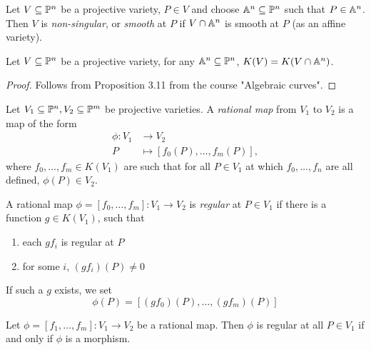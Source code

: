 \begin{definition}
	Let $V \subseteq \mathbb{P}^n$ be a projective variety,
	$P \in V$ and choose $\mathbb{A}^n \subseteq \mathbb{P}^n$ such
	that $P \in \mathbb{A}^n$. Then $V$ is \emph{non-singular}, or \emph{smooth}
	at $P$ if $V \cap \mathbb{A}^n$ is smooth at $P$ (as an affine variety).
\end{definition}

\begin{proposition}
	Let $V \subseteq \mathbb{P}^n$ be a projective variety,
	for any $\mathbb{A}^n \subseteq \mathbb{P}^n$, $K(V) = K(V\cap \mathbb{A}^n)$.
\end{proposition}

\begin{proof}
	Follows from Proposition 3.11 from the course "Algebraic curves".
\end{proof}

\begin{definition}
	Let $V_1 \subseteq \mathbb{P}^n, V_2 \subseteq \mathbb{P}^m$ be projective varieties.
	A \emph{rational map} from $V_1$ to $V_2$ is a map of the form
	\begin{align*}
		\phi: V_1 &\to V_2\\
		P &\mapsto [f_0(P), \dots, f_m(P)],
	\end{align*}
	where $f_0, \dots, f_m \in K(V_1)$ are such that
	for all $P \in V_1$ at which $f_0, \dots, f_n$ are all defined, 
	$\phi(P) \in V_2$.
\end{definition}

\begin{definition}
	A rational map $\phi = [f_0, \dots, f_m]: V_1 \to V_2$
	is \emph{regular} at $P \in V_1$ if there is a function $g \in K(V_1)$,
	such that
	\begin{enumerate}[label=(\roman*)]
		\item each $gf_i$ is regular at $P$
		\item for some $i$, $(gf_i)(P) \neq 0$
	\end{enumerate}
	If such a $g$ exists, we set
	\begin{equation*}
		\phi(P) = [(gf_0)(P), \dots, (gf_m)(P)]
	\end{equation*}
\end{definition}

\begin{proposition}
	Let $\phi = [f_1, \dots, f_m]: V_1 \to V_2$ be a rational map. Then
	$\phi$ is regular at all $P \in V_1$ if and only if
	$\phi$ is a morphism.
\end{proposition}

